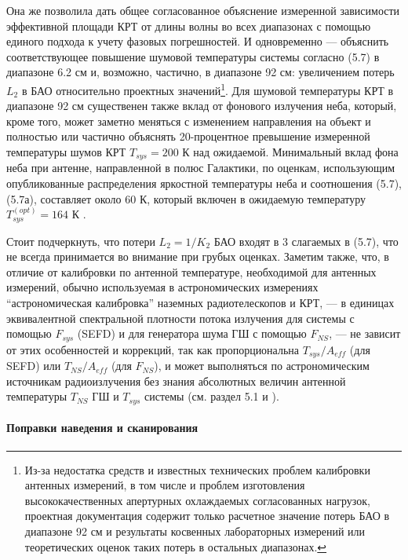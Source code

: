 Она же  позволила дать общее согласованное объяснение измеренной
зависимости эффективной площади КРТ от длины волны во всех диапазонах с
помощью единого подхода к учету фазовых погрешностей. И одновременно ---
объяснить соответствующее повышение шумовой температуры системы согласно
(5.7)  в диапазоне 6.2 см и, возможно, частично, в диапазоне
92 см: увеличением потерь $L_2$ в БАО относительно проектных значений\footnote
{Из-за недостатка средств  и известных технических проблем калибровки
антенных измерений, в том числе и проблем
изготовления высококачественных апертурных охлаждаемых согласованных нагрузок,
проектная документация содержит только расчетное значение потерь БАО в
диапазоне 92 см и результаты косвенных лабораторных измерений  или теоретических
оценок таких потерь в остальных диапазонах.}. Для шумовой температуры КРТ
в диапазоне 92 см существенен также вклад от фонового излучения неба,
который, кроме того, может заметно меняться с изменением направления на
объект и полностью или частично объяснять 20-процентное превышение
измеренной температуры шумов КРТ $T_{sys} = 200$ К над ожидаемой.
Минимальный вклад фона неба при антенне, направленной в полюс Галактики,
по оценкам, использующим опубликованные распределения яркостной
температуры неба и соотношения (5.7), (5.7а), составляет около 60 К,
который включен в ожидаемую температуру $T_{sys}^{(opt)} = 164 $ К
 \cite{}.

Стоит подчеркнуть, что потери $L_2 = 1 / K_2$ БАО входят в 3 слагаемых
в (5.7), что не всегда принимается во внимание при грубых оценках.
Заметим также, что, в отличие от калибровки по антенной температуре,
необходимой для антенных измерений, обычно
используемая в астрономических измерениях ``астрономическая калибровка'' наземных
радиотелескопов и КРТ, --- в единицах эквивалентной спектральной плотности
потока излучения для системы с помощью $F_{sys}$ (SEFD) и
для генератора шума ГШ  с помощью $F_{NS}$,   ---
не зависит от этих особенностей и
коррекций, так как пропорциональна $T_{sys}/A_{eff}$ (для SEFD) или
$T_{NS} / A_{eff}$ (для $F_{NS}$),
и может выполняться по астрономическим источникам радиоизлучения
без знания абсолютных величин антенной температуры $T_{NS}$ ГШ
и $T_{sys}$ системы (см. раздел 5.1 и \cite{}).

\paragraph{Поправки наведения и сканирования}

